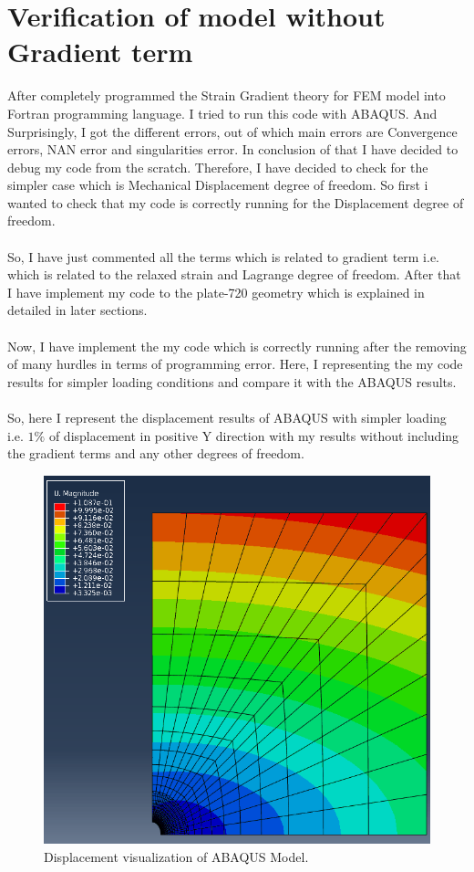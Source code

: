 \documentclass[12pt]{article}
\begin{document}
\section{Verification of model without Gradient term}
After completely programmed the Strain Gradient theory for FEM model into Fortran programming language. I tried to run this code with ABAQUS. And Surprisingly, I got the different errors, out of which main errors are Convergence errors, NAN error and singularities error. In conclusion of that I have decided to debug my code from the scratch. Therefore, I have decided to check for the simpler case which is Mechanical Displacement degree of freedom. So first i wanted to check that my code is correctly running for the Displacement degree of freedom.
\\
\\
So, I have just commented all the terms which is related to gradient term i.e. which is related to the relaxed strain and Lagrange degree of freedom. After that I have implement my code to the plate-720 geometry which is explained in detailed in later sections.
\\
\\ 
Now, I have implement the my code which is correctly running after the removing of many hurdles in terms of programming error. Here, I representing the my code results for simpler loading conditions and compare it with the ABAQUS results.  
\\
\\
So, here I represent the displacement results of ABAQUS with simpler loading i.e. $ 1 \% $ of displacement in positive Y direction with my results without including the gradient terms and any other degrees of freedom.
\begin{figure}[H]
	\begin{center}
		\includegraphics[scale=0.4]{ABAQUS_result.png}  
	\end{center}  
    \caption{Displacement visualization of ABAQUS Model.}
\end{figure}
\end{document}
